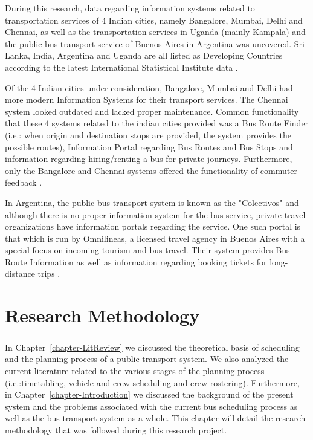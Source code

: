 \documentclass[12pt, oneside]{report}
\begin{document}
During this research, data regarding information systems related to transportation services of 4 Indian cities, namely Bangalore, Mumbai, Delhi and Chennai, as well as the transportation services in Uganda (mainly Kampala) and the public bus transport service of Buenos Aires in Argentina was uncovered. Sri Lanka, India, Argentina and Uganda are all listed as Developing Countries according to the latest International Statistical Institute data \citep{ISI2013}.

Of the 4 Indian cities under consideration, Bangalore, Mumbai and Delhi had more modern Information Systems for their transport services. The Chennai system looked outdated and lacked proper maintenance. Common functionality that these 4 systems related to the indian cities provided was a Bus Route Finder (i.e.: when origin and destination stops are provided, the system provides the possible routes), Information Portal regarding Bus Routes and Bus Stops and information regarding hiring/renting a bus for private journeys. Furthermore, only the Bangalore and Chennai systems offered the functionality of commuter feedback \citep{BMTC1997, BEST1995, DTC2012, MTC2001}.

In Argentina, the public bus transport system is known as the "Colectivos" and although there is no proper information system for the bus service, private travel organizations have information portals regarding the service. One such portal is that which is run by Omnilineas, a licensed travel agency in Buenos Aires with a special focus on incoming tourism and bus travel. Their system provides Bus Route Information as well as information regarding booking tickets for long-distance trips \citep{Omnilineas2013}.

\newpage


\chapter{Research Methodology}
\label{chapter-ResearchMethodology}

\paragraph{ } In Chapter~\ref{chapter-LitReview} we discussed the theoretical basis of scheduling and the planning process of a public transport system. We also analyzed the current literature related to the various stages of the planning process (i.e.:timetabling, vehicle and crew scheduling and crew rostering). Furthermore, in Chapter~\ref{chapter-Introduction} we discussed the background of the present system and the problems associated with the current bus scheduling process as well as the bus transport system as a whole. This chapter will detail the research methodology that was followed during this research project.
\end{document}
